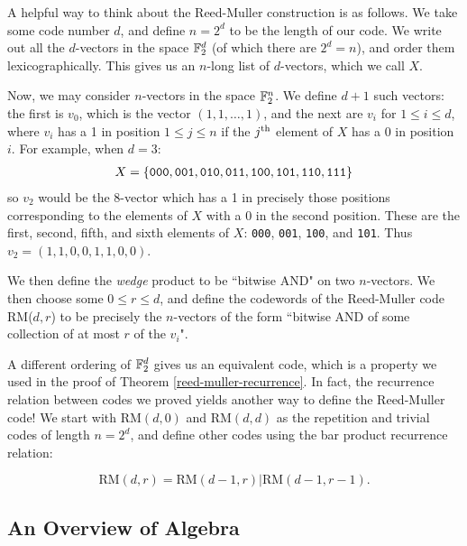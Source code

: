 \documentclass{article}
\begin{document}
\begin{remark}
    A helpful way to think about the Reed-Muller construction is as follows.
    We take some code number $d$, and define $n = 2^d$ to be the length of our code.
    We write out all the $d$-vectors in the space $\mathbb{F}_2^d$ (of which there are $2^d = n$), and order them lexicographically. This gives us an $n$-long list of $d$-vectors, which we call $X$.
    
    Now, we may consider $n$-vectors in the space $\mathbb{F}_2^n$. We define $d+1$ such vectors: the first is $v_0$, which is the vector $(1, 1, \dots, 1)$, and the next are $v_i$ for $1 \leq i \leq d$, where $v_i$ has a 1 in position $1 \leq j \leq n$ if the $j^{\text{th}}$ element of $X$ has a 0 in position $i$. For example, when $d = 3$:
    \begin{align*}
    	X = \left\lbrace 
		\texttt{000}, \texttt{001}, \texttt{010}, \texttt{011},
		\texttt{100}, \texttt{101}, \texttt{110}, \texttt{111}
		 \right\rbrace
	\end{align*}
	so $v_2$ would be the 8-vector which has a 1 in precisely those positions corresponding to the elements of $X$ with a 0 in the second position. These are the first, second, fifth, and sixth elements of $X$: 
	\texttt{000}, \texttt{001}, \texttt{100}, and \texttt{101}. Thus $v_2 = (1, 1, 0, 0, 1, 1, 0, 0)$.
	
	We then define the \textit{wedge} product to be ``bitwise AND" on two $n$-vectors. We then choose some $0 \leq r \leq d$, and define the codewords of the Reed-Muller code RM($d, r$) to be precisely the $n$-vectors of the form ``bitwise AND of some collection of at most $r$ of the $v_i$".
\end{remark}

\begin{note}
	A different ordering of $\mathbb{F}_2^d$ gives us an equivalent code, which is a property we used in the proof of Theorem \ref{reed-muller-recurrence}. In fact, the recurrence relation between codes we proved yields another way to define the Reed-Muller code! We start with $\mathrm{RM}(d, 0)$ and $\mathrm{RM}(d, d)$ as the repetition and trivial codes of length $n = 2^d$, and define other codes using the bar product recurrence relation:
\end{note}
\[
\mathrm{RM}(d, r) = \mathrm{RM}(d-1, r)|\mathrm{RM}(d-1, r-1).
\]


\pagebreak
\subsection{An Overview of Algebra}
\end{document}
